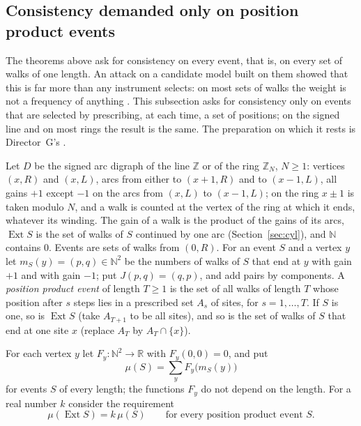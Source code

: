 \subsection{Consistency demanded only on position product events}

The theorems above ask for consistency on every event, that is, on every set of walks of one length. An attack on a candidate model built on them showed that this is far more than any instrument selects: on most sets of walks the weight is not a frequency of anything \cite{comp4s}. This subsection asks for consistency only on events that are selected by prescribing, at each time, a set of positions; on the signed line and on most rings the result is the same. The preparation on which it rests is Director~G's \cite{dgmask}.

Let $D$ be the signed arc digraph of the line $\mathbb{Z}$ or of the ring $\mathbb{Z}_N$, $N\ge1$: vertices $(x,R)$ and $(x,L)$, arcs from either to $(x+1,R)$ and to $(x-1,L)$, all gains $+1$ except $-1$ on the arcs from $(x,L)$ to $(x-1,L)$; on the ring $x\pm1$ is taken modulo $N$, and a walk is counted at the vertex of the ring at which it ends, whatever its winding. The gain of a walk is the product of the gains of its arcs, $\operatorname{Ext}S$ is the set of walks of $S$ continued by one arc (Section~\ref{sec:cyl}), and $\mathbb{N}$ contains $0$. Events are sets of walks from $(0,R)$. For an event $S$ and a vertex $y$ let $m_S(y)=(p,q)\in\mathbb{N}^2$ be the numbers of walks of $S$ that end at $y$ with gain $+1$ and with gain $-1$; put $J(p,q)=(q,p)$, and add pairs by components. A \emph{position product event} of length $T\ge1$ is the set of all walks of length $T$ whose position after $s$ steps lies in a prescribed set $A_s$ of sites, for $s=1,\dots,T$. If $S$ is one, so is $\operatorname{Ext}S$ (take $A_{T+1}$ to be all sites), and so is the set of walks of $S$ that end at one site $x$ (replace $A_T$ by $A_T\cap\{x\}$).

For each vertex $y$ let $F_y\colon\mathbb{N}^2\to\mathbb{R}$ with $F_y(0,0)=0$, and put
\begin{equation}\label{eq:multirule}
\mu(S)=\sum_{y}F_y\bigl(m_S(y)\bigr)
\end{equation}
for events $S$ of every length; the functions $F_y$ do not depend on the length. For a real number $k$ consider the requirement
\begin{equation}\label{eq:ppcons}
\mu(\operatorname{Ext}S)=k\,\mu(S)\qquad\text{for every position product event }S .
\end{equation}

